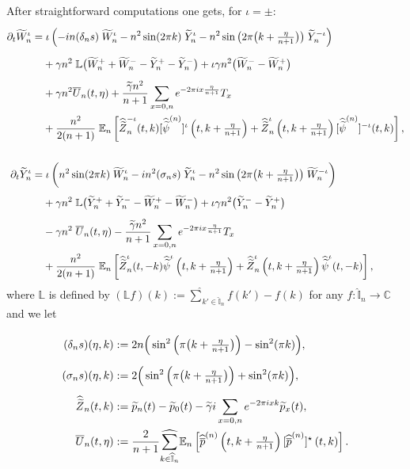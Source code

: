 \documentclass[EJP]{ejpecp} %
\newcommand{\bb}[1]{{\mathbb #1}}
\newcommand\T{{\mathbb I}}
\newcommand \ga{\gamma}
\renewcommand{\hat}{\widehat}
\renewcommand{\tilde}{\widetilde}
\renewcommand{\bar}{\overline}
\numberwithin{equation}{section}
\begin{document}
After straightforward computations one gets, for $\iota=\pm$:
\begin{align}
\partial_t \tilde W^\iota_n = & \; \vphantom{\int} \iota\left(-in  (\delta_ns)\;  \tilde W_n^\iota -n^2\sin(2\pi k)\; \tilde Y_n^\iota-n^2\sin\big(2\pi\big(k+\tfrac{\eta}{n+1}\big)\big)\; \tilde Y_n^{-\iota}\right)\label{eq:closed-syst1f}  \\
&
 + \gamma n^2\; \bb
 L\big(\tilde W_n^++\tilde W_n^--{\tilde Y^+_n-\tilde Y_n^-}\big)+\iota\gamma
n^2\big(\tilde W_n^--\tilde W_n^+\big)\vphantom{\int}\notag\\
&
+\gamma n^2 \bar U_n(t,\eta)
 +\frac{\tilde \ga n^2}{n+1}\sum_{x=0,n} e^{-2\pi i x\frac\eta{n+1}} T_x \notag\\
&
+\frac{n^2}{2(n+1)}\;\bb E_n\left[
    \hat{\tilde Z}_n^{-\iota}(t, k)[\hat{\tilde \psi}^{(n)}]^{\iota}\left(t,k+\tfrac{\eta}{n+1}\right)+
 \hat{\tilde Z}_n^{\iota}\left(t,k+\tfrac{\eta}{n+1}\right)[\hat{\tilde \psi}^{(n)}]^{-\iota}(t,k)\right], \notag
\\ ~\notag \\ 
\partial_t \tilde Y^\iota_n  = & \; \iota\left(n^2\sin(2\pi k)\; \tilde W_n^\iota-i n^2 (\sigma_n s) \; \tilde Y^\iota_n -n^2\sin\big(2\pi\big(k+\tfrac{\eta}{n+1}\big)\big)\; \tilde W_n^{-\iota} \vphantom{\int} \right)\label{eq:closed-syst2f} \\
&
+ \gamma n^2\;\bb L\big(\tilde Y^+_n+\tilde Y^-_n - {\tilde W_n^+-\tilde W^-_n}\big)+\iota \gamma
n^2\big(\tilde Y_n^--\tilde Y_n^+\big)\vphantom{\int} \notag \\
&
-\gamma n^2\; \bar U_n(t,\eta)
-\frac{\tilde \ga n^2}{n+1}\sum_{x=0,n} e^{-2\pi i x\frac\eta{n+1}} T_x\vphantom{\int}\notag\\
&\vphantom{\int}
+\frac{n^2}{2(n+1)}\; \bb E_n\left[
    \hat{\tilde Z}_n^\iota(t,-k)\hat{\tilde\psi}^\iota\left(t,k+\tfrac{\eta}{n+1}\right)+
\hat{\tilde Z}_n^\iota\left(t,k+\tfrac{\eta}{n+1}\right)\hat{\tilde\psi}^{\iota}(t,-k)\right], \notag
\end{align} 
where $\bb L$  is defined by $
(\bb L f)(k):=\underset{{k'\in \widehat{\T}_n}}{{\hat\sum}}f(k') -
f(k)$ for any $f:\widehat{\T}_n \to \mathbb{C}$ 
and we let
\begin{equation}
\label{012308a} \begin{split}
(\delta_n s)(\eta,k)&:=2n\Big(\sin^2\left(\pi\big(k+\tfrac{\eta}{n+1}\big)\right)-\sin^2(\pi k)\Big), \vphantom{\Bigg\{}
\\
(\sigma_ns)(\eta,k)&:=2\Big(\sin^2\left(\pi\big(k+\tfrac{\eta}{n+1}\big)\right)+\sin^2(\pi
                     k)\Big),\\
\hat{\tilde Z}_n(t,k)&:=  \tilde p_n(t)-\tilde p_0(t)
   -\tilde\gamma i\sum_{x=0,n}e^{-2\pi i x k}\tilde p_{x}(t),\vphantom{\Bigg\{}\\
\bar U_n(t,\eta)&:=\frac 2{n+1}\underset{{k\in \widehat{\T}_n}}{{\hat\sum}}\mathbb E_n\left[  \widehat{\bar  p}^{(n)}\left(t,k+\tfrac{\eta}{n+1}\right)  [\widehat{\bar  p}^{(n)}]^\star\left(t,k\right)\right] .
 \end{split}\end{equation}
\end{document}
